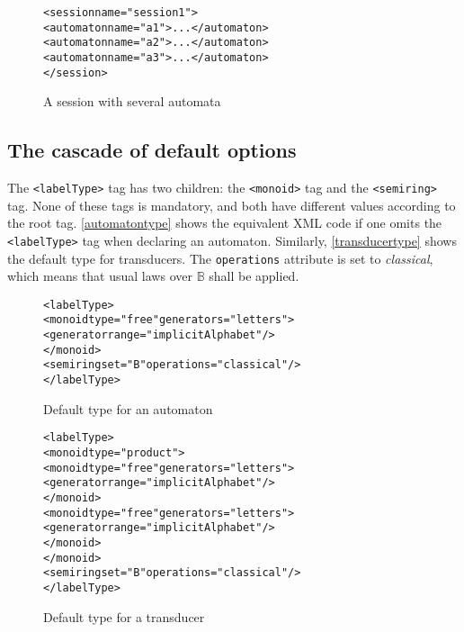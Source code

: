 \documentclass[a4paper]{article}
\newcommand{\xtag}[1]{\texttt{<#1>}}
\newcommand{\xattr}[1]{\texttt{#1}}
\begin{document}
\begin{figure}[htp]
  \small
  \begin{center}
\begin{alltt}
<session name="session1">
  <automaton name="a1">...</automaton>
  <automaton name="a2">...</automaton>
  <automaton name="a3">...</automaton>
</session>
\end{alltt}

\caption{A session with several automata}
\label{session1}
  \end{center}
\end{figure}

\subsection{The cascade of default options}

The \xtag{labelType} tag has two children: the \xtag{monoid} tag and the
\xtag{semiring} tag. None of these tags is mandatory, and both have
different values according to the root tag. \autoref{automatontype}
shows the equivalent XML code if one omits the \xtag{labelType} tag when
declaring an automaton. Similarly, \autoref{transducertype} shows the
default type for transducers.  The \xattr{operations} attribute is
set to \textit{classical}, which means that usual laws over
$\mathbb{B}$ shall be applied.

\begin{figure}[htp]
  \begin{center}
\begin{alltt}
<labelType>
  <monoid type="free" generators="letters">
     <generator range="implicitAlphabet"/>
  </monoid>
  <semiring set="B" operations="classical"/>
</labelType>
\end{alltt}

\caption{Default type for an automaton}
\label{automatontype}
  \end{center}
\end{figure}


\begin{figure}[htp]
  \begin{center}
\begin{alltt}
<labelType>
  <monoid type="product">
     <monoid type="free" generators="letters">
       <generator range="implicitAlphabet"/>
     </monoid>
     <monoid type="free" generators="letters">
       <generator range="implicitAlphabet"/>
     </monoid>
  </monoid>
  <semiring set="B" operations="classical"/>
</labelType>
\end{alltt}

\caption{Default type for a transducer}
\label{transducertype}
  \end{center}
\end{figure}
\end{document}
